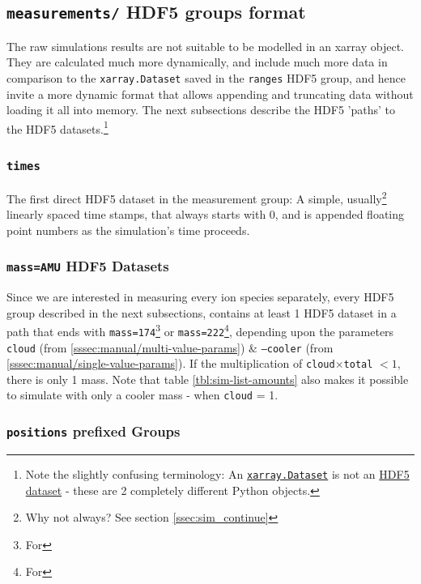 \subsection{\texttt{measurements/} HDF5 groups format}\label{ssec:HDF5-measurements-format}

The raw simulations results are not suitable to be modelled in an xarray object. They are calculated much more dynamically, and include much more data in comparison to the \texttt{xarray.Dataset} saved in the \texttt{ranges} HDF5 group, and hence invite a more dynamic format that allows appending and truncating data without loading it all into memory. The next subsections describe the HDF5 'paths' to the HDF5 datasets.\footnote{Note the slightly confusing terminology: An \href{https://docs.xarray.dev/en/stable/generated/xarray.Dataset.html}{\texttt{xarray.Dataset}} is not an \href{https://docs.h5py.org/en/stable/high/dataset.html}{HDF5 dataset} - these are 2 completely different Python objects.}

\subsubsection{\texttt{times}}

The first direct HDF5 dataset in the measurement group: A simple, usually\footnote{Why not always? See section \ref{ssec:sim_continue}} linearly spaced time stamps, that always starts with 0, and is appended floating point numbers as the simulation's time proceeds.

\subsubsection{\texttt{mass=AMU} HDF5 Datasets}

Since we are interested in measuring every ion species separately, every HDF5 group described in the next subsections, contains at least 1 HDF5 dataset in a path that ends with \texttt{mass=174}\footnote{For } or \texttt{mass=222}\footnote{For }, depending upon the parameters \texttt{cloud} (from \ref{sssec:manual/multi-value-params}) \& \texttt{--cooler} (from \ref{sssec:manual/single-value-params}). If the multiplication of \texttt{cloud}$\times$\texttt{total} $<1$, there is only 1 mass. Note that table \ref{tbl:sim-list-amounts} also makes it possible to simulate with only a cooler mass - when \texttt{cloud} = 1.

\subsubsection{\texttt{positions} prefixed Groups}

